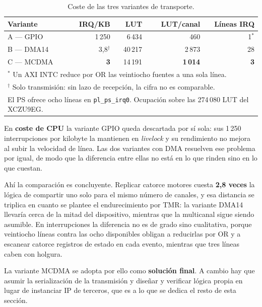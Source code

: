 \begin{table}[H]
    \centering
    \begin{tabular}{lrrrr}
        \hline
        \textbf{Variante} & \textbf{IRQ/KB} & \textbf{LUT} & \textbf{LUT/canal} & \textbf{Líneas IRQ} \\
        \hline
        A --- GPIO  & 1\,250 & 6\,434  & 460   & 1$^{*}$ \\
        B --- DMA14 & 3,8$^{\dagger}$ & 40\,217 & 2\,873 & 28 \\
        C --- MCDMA & \textbf{3} & 14\,191 & \textbf{1\,014} & \textbf{3} \\
        \hline
        \multicolumn{5}{l}{\footnotesize $^{*}$ Un AXI INTC reduce por OR las veintiocho fuentes a una sola línea.} \\
        \multicolumn{5}{l}{\footnotesize $^{\dagger}$ Solo transmisión: sin lazo de recepción, la cifra no es comparable.} \\
        \multicolumn{5}{l}{\footnotesize El PS ofrece ocho líneas en \texttt{pl\_ps\_irq0}. Ocupación sobre las 274\,080 LUT del XCZU9EG.} \\
    \end{tabular}
    \caption{Coste de las tres variantes de transporte.}
    \label{tab:coste_variantes}
\end{table}

En \textbf{coste de CPU} la variante GPIO queda descartada por sí sola: sus 1\,250 interrupciones
por kilobyte la mantienen en \textit{livelock} y su rendimiento no mejora al subir la velocidad de
línea. Las dos variantes con DMA resuelven ese problema por igual, de modo que la diferencia entre
ellas no está en lo que rinden sino en lo que cuestan.

Ahí la comparación es concluyente. Replicar catorce motores cuesta \textbf{2,8 veces} la lógica de
compartir uno solo para el mismo número de canales, y esa distancia se triplica en cuanto se
plantee el endurecimiento por TMR: la variante DMA14 llevaría cerca de la mitad del dispositivo,
mientras que la multicanal sigue siendo asumible. En interrupciones la diferencia no es de grado
sino cualitativa, porque veintiocho líneas contra las ocho disponibles obligan a reducirlas por OR
y a escanear catorce registros de estado en cada evento, mientras que tres líneas caben con
holgura.

La variante MCDMA se adopta por ello como \textbf{solución final}. A cambio hay que asumir la
serialización de la transmisión y diseñar y verificar lógica propia en lugar de instanciar IP de
terceros, que es a lo que se dedica el resto de esta sección.

